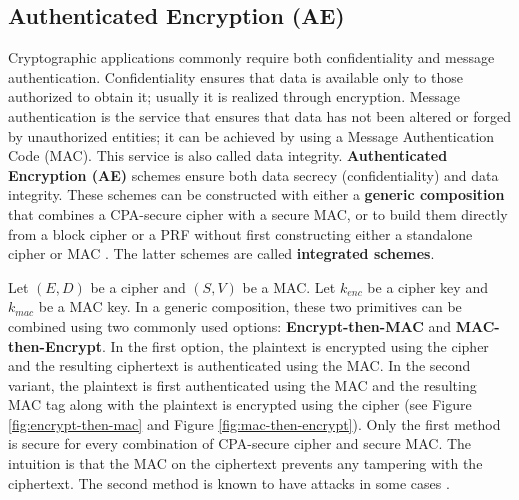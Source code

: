 \subsection{Authenticated Encryption (AE)}
Cryptographic applications commonly require both confidentiality and message authentication. Confidentiality ensures that data is available only to those authorized to obtain it; usually it is realized through encryption.  Message authentication is the service that ensures that data has not been altered or forged by unauthorized entities; it can be achieved by using a Message Authentication Code (MAC). This service is also called data integrity. \textbf{Authenticated Encryption (AE)} \cite{ae} schemes ensure both data secrecy (confidentiality) and data integrity. These schemes can be constructed with either a \textbf{generic composition} that combines a CPA-secure cipher with a secure MAC, or to build them directly from a block cipher or a PRF without first constructing either a standalone cipher or MAC \cite{gradcourse}. The latter schemes are called \textbf{integrated schemes}.

Let $(E, D)$ be a cipher and $(S, V)$ be a MAC. Let $k_{enc}$ be a cipher key and $k_{mac}$ be a MAC key. In a generic composition, these two primitives can be combined using two commonly used options: \textbf{Encrypt-then-MAC} and \textbf{MAC-then-Encrypt}. In the first option, the plaintext is encrypted using the cipher and the resulting ciphertext is authenticated using the MAC. In the second variant, the plaintext is first authenticated using the MAC and the resulting MAC tag along with the plaintext is encrypted using the cipher (see Figure \ref{fig:encrypt-then-mac} and Figure \ref{fig:mac-then-encrypt}). Only the first method is secure for every combination of CPA-secure cipher and secure MAC. The intuition is that the MAC on the ciphertext prevents any tampering with the ciphertext. The second method is known to have attacks in some cases \cite{gradcourse}.


